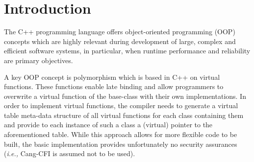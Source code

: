 \section{Introduction}
\label{chapter:Introduction}

The C++ programming language offers object-oriented programming (OOP) concepts which are highly relevant 
during development of large, complex and efficient software systems, in particular, 
when runtime performance and reliability are primary objectives.

A key OOP concept is polymorphism which is based in C++ on virtual functions. These functions enable late binding and allow programmers 
to overwrite a virtual function of the base-class with their 
own implementations. In order to implement virtual functions, the compiler needs to generate a virtual table meta-data structure of all 
virtual functions for each class containing 
them and provide to each instance of such a class a (virtual) pointer to the aforementioned table. 
While this approach allows for more flexible code to be built, the basic implementation provides 
unfortunately no security assurances (\textit{i.e.,} Cang-CFI is assumed not to be used). 


